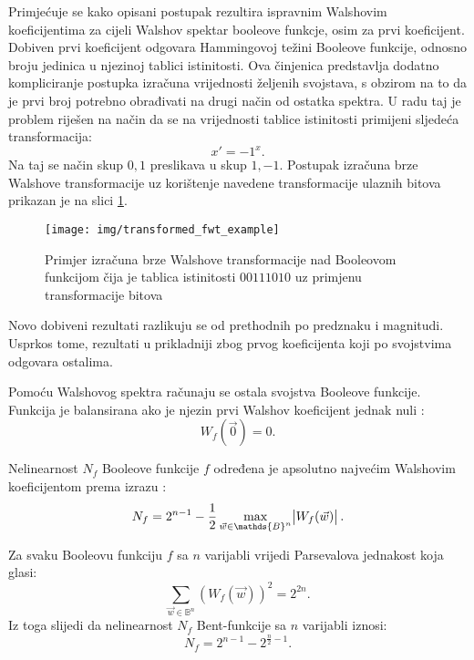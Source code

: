 Primjećuje se kako opisani postupak rezultira ispravnim Walshovim koeficijentima za cijeli Walshov spektar booleove funkcje, osim za prvi koeficijent.
Dobiven prvi koeficijent odgovara Hammingovoj težini Booleove funkcije, odnosno broju jedinica u njezinoj tablici istinitosti.
Ova činjenica predstavlja dodatno kompliciranje postupka izračuna vrijednosti željenih svojstava, s obzirom na to da je prvi broj potrebno obrađivati na drugi način od ostatka spektra.
U radu \cite{MeasuringBoolean} taj je problem riješen na način da se na vrijednosti tablice istinitosti primijeni sljedeća transformacija:
\begin{equation}
    x' = -1^x.
\end{equation}
Na taj se način skup ${0, 1}$ preslikava u skup ${1, -1}$.
Postupak izračuna brze Walshove transformacije uz korištenje navedene transformacije ulaznih bitova prikazan je na slici \ref{fig:transformed_fwt_example}.
\begin{figure}[ht!] 
    \centering
    \texttt{[image: img/transformed\_fwt\_example]}
    \captionsetup{justification=centering}
    \caption{Primjer izračuna brze Walshove transformacije nad Booleovom funkcijom čija je tablica istinitosti $00111010$ uz primjenu transformacije bitova}
    \label{fig:transformed_fwt_example}
\end{figure}
Novo dobiveni rezultati razlikuju se od prethodnih po predznaku i magnitudi.
Usprkos tome, rezultati u prikladniji zbog prvog koeficijenta koji po svojstvima odgovara ostalima.

Pomoću Walshovog spektra računaju se ostala svojstva Booleove funkcije.
Funkcija je balansirana ako je njezin prvi Walshov koeficijent jednak nuli \cite{MaximalNonlinearity}:
\begin{equation}
    W_f(\vec{0}) = 0.
\end{equation} 

Nelinearnost $N_f$ Booleove funkcije $f$ određena je apsolutno najvećim Walshovim koeficijentom prema izrazu \cite{MaximalNonlinearity}:
\begin{equation}
    N_f = 2^{n-1} - \frac{1}{2}\max_{\vec{w} \in \mathds{B}^n} \abs{W_f(\vec{w})}.
\end{equation}

Za svaku Booleovu funkciju $f$ sa $n$ varijabli vrijedi Parsevalova jednakost koja glasi:
\begin{equation}
    \sum_{\vec{w}\in \mathds{B}^n} \left( W_f(\vec{w}) \right)^2 = 2^{2n}.
\end{equation} 
Iz toga slijedi da nelinearnost $N_f$ Bent-funkcije sa $n$ varijabli iznosi:
\begin{equation}
    N_f = 2^{n-1} - 2^{\frac{n}{2}-1}.
\end{equation}